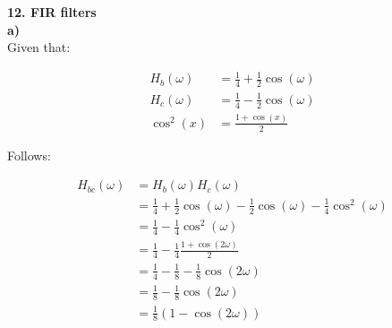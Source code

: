 %
%
%
%
%
%
%
%
%
%


\textbf{\large 12. FIR filters}
\\

\textbf{a)}\\
Given that:

\begin{align}
	H_b(\omega) &= \frac{1}{4} + \frac{1}{2} \cos(\omega) \\
	H_c(\omega) &= \frac{1}{4} - \frac{1}{2} \cos(\omega) \\
	\cos^2(x) &= \frac{1+\cos(x)}{2}
\end{align}

Follows:

\begin{align*}
	H_{bc}(\omega) &= H_b(\omega) H_c(\omega) \\
	&= \frac{1}{4} + \frac{1}{2} \cos(\omega) - \frac{1}{2} \cos(\omega) - \frac{1}{4} \cos^2(\omega)\\
	&= \frac{1}{4} - \frac{1}{4} \cos^2(\omega) \\
	&= \frac{1}{4} - \frac{1}{4} \frac{1+\cos(2\omega)}{2} \\
	&= \frac{1}{4} - \frac{1}{8} - \frac{1}{8}\cos(2\omega) \\
	&= \frac{1}{8} - \frac{1}{8} \cos(2\omega) \\
	&= \frac{1}{8} \left(1 - \cos(2\omega)\right)
\end{align*}

